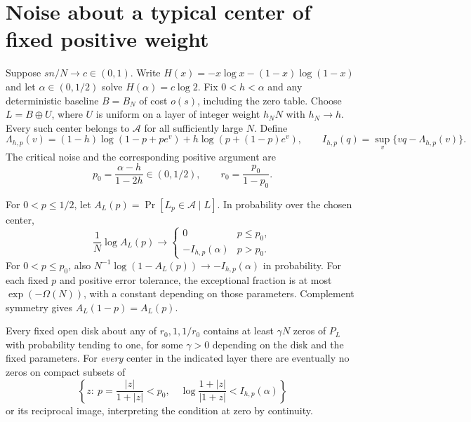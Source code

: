 \section{Noise about a typical center of fixed positive weight}

Suppose \(sn/N\to c\in(0,1)\). Write \(H(x)=-x\log x-(1-x)\log(1-x)\) and let \(\alpha\in(0,1/2)\) solve \(H(\alpha)=c\log2\). Fix \(0<h<\alpha\) and any deterministic baseline \(B=B_N\) of cost \(o(s)\), including the zero table. Choose \(L=B\oplus U\), where \(U\) is uniform on a layer of integer weight \(h_NN\) with \(h_N\to h\). Every such center belongs to \(\mathcal A\) for all sufficiently large \(N\). Define
\[
 \Lambda_{h,p}(v)=(1-h)\log(1-p+pe^v)+h\log(p+(1-p)e^v),
 \qquad I_{h,p}(q)=\sup_v\{vq-\Lambda_{h,p}(v)\}.
\]
The critical noise and the corresponding positive argument are
\[
 p_0=\frac{\alpha-h}{1-2h}\in(0,1/2),\qquad r_0=\frac{p_0}{1-p_0}.
\]

\begin{theorem}
For \(0<p\le 1/2\), let \(A_L(p)=\Pr[L_p\in\mathcal A\mid L]\). In probability over the chosen center,
\[
 \frac1N\log A_L(p)\longrightarrow
 \begin{cases}0&p\le p_0,\\-I_{h,p}(\alpha)&p>p_0.\end{cases}
\]
For \(0<p\le p_0\), also \(N^{-1}\log(1-A_L(p))\to-I_{h,p}(\alpha)\) in probability. For each fixed \(p\) and positive error tolerance, the exceptional fraction is at most \(\exp(-\Omega(N))\), with a constant depending on those parameters. Complement symmetry gives \(A_L(1-p)=A_L(p)\).

Every fixed open disk about any of \(r_0,1,1/r_0\) contains at least \(\gamma N\) zeros of \(P_L\) with probability tending to one, for some \(\gamma>0\) depending on the disk and the fixed parameters. For \emph{every} center in the indicated layer there are eventually no zeros on compact subsets of
\[
 \left\{z:\ p=\frac{|z|}{1+|z|}<p_0,\quad
       \log\frac{1+|z|}{|1+z|}< I_{h,p}(\alpha)\right\}
\]
or its reciprocal image, interpreting the condition at zero by continuity.
\end{theorem}

